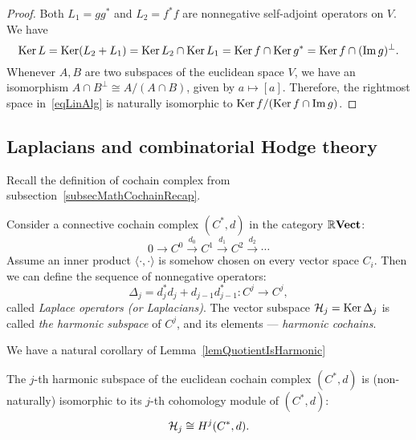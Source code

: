 \begin{proof}
Both $L_1=gg^*$ and $L_2=f^*f$ are nonnegative self-adjoint operators on $V$. We have
\begin{equation}\label{eqLinAlg}
\operatorname{Ker} L=\operatorname{Ker}(L_2+L_1)=\operatorname{Ker} L_2\cap \operatorname{Ker} L_1=\operatorname{Ker} f\cap \operatorname{Ker} g^*=\operatorname{Ker} f\cap (\operatorname{Im} g)^\bot.
\end{equation}
Whenever $A,B$ are two subspaces of the euclidean space $V$, we have an isomorphism $A\cap B^{\bot}\cong A/(A\cap B)$, given by $a\mapsto [a]$. Therefore, the rightmost space in~\eqref{eqLinAlg} is naturally isomorphic to $\operatorname{Ker} f/(\operatorname{Ker} f\cap \operatorname{Im} g)$.
\end{proof}

\subsection{Laplacians and combinatorial Hodge theory}\label{subsecMathHodge}

Recall the definition of cochain complex from subsection~\ref{subsecMathCochainRecap}.

\begin{defin}\label{definLaplaceGeneralCochain}
Consider a connective cochain complex $(C^*,d)$ in the category $\mathbb{R}\mathbf{Vect}$:
\[
0\to C^0\stackrel{d_0}{\to} C^1 \stackrel{d_1}{\to} C^2 \stackrel{d_2}{\to}\cdots
\]
Assume an inner product $\langle\cdot,\cdot\rangle$ is somehow chosen on every vector space $C_i$. Then we can define the sequence of nonnegative operators:
\[
\Delta_j=d_j^*d_j+d_{j-1}d_{j-1}^*\colon C^j\to C^j,
\]
called \emph{Laplace operators (or Laplacians)}. The vector subspace $\mathcal{H}_j=\operatorname{Ker}\Delta_j$ is called \emph{the harmonic subspace} of $C^j$, and its elements --- \emph{harmonic cochains}.
\end{defin}

We have a natural corollary of Lemma~\ref{lemQuotientIsHarmonic}

\begin{cor}\label{corHarmonicIsCohomology}
The $j$-th harmonic subspace of the euclidean cochain complex $(C^*,d)$ is (non-naturally) isomorphic to its $j$-th cohomology module of $(C^*,d)$:
\begin{equation}\label{eqHarmonicIsCohomology}
\mathcal{H}_j\cong H^j(C^*,d).
\end{equation}
\end{cor}


